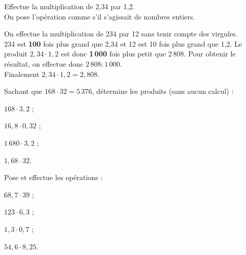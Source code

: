 \begin{methode*1}

\begin{exemple*1}
Effectue la multiplication de 2,34 par 1,2.\\[1em]
On pose l'opération comme s'il s'agissait de nombres entiers. 

On effectue la multiplication de 234 par 12 sans tenir compte des virgules.\\[0.75em]
234 est \textcolor{B1}{\textbf{100}} fois plus grand que 2,34 et 12 est 10 fois plus grand que 1,2. Le produit $2,34 \cdot 1,2$ est donc \textcolor{J1}{\textbf{1\,000}} fois plus petit que 2\,808. Pour obtenir le résultat, on effectue donc $2\,808 : 1\,000$.\\[0.75em]
Finalement $2,34 \cdot 1,2 = 2,808$.
\end{exemple*1}

\exercice
Sachant que $168 \cdot 32 = 5\,376$, détermine les produits (sans aucun calcul) :
\begin{colenumerate}{4}
 \item $168 \cdot 3,2$ ;
 \item $16,8 \cdot 0,32$ ;
 \item $1\,680 \cdot 3,2$ ;
 \item $1,68 \cdot 32$.
\end{colenumerate}

\exercice
Pose et effectue les opérations :
\begin{colenumerate}{4}
 \item $68,7 \cdot 39$ ;
 \item $123 \cdot 6,3$ ;
 \item $1,3 \cdot 0,7$ ;
 \item $54,6 \cdot 8,25$.
\end{colenumerate}

\end{methode*1}


